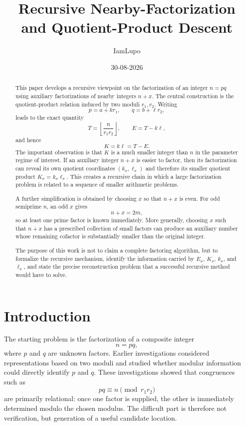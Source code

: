 \documentclass[11pt,a4paper]{article}
\title{\textbf{Recursive Nearby-Factorization and Quotient-Product Descent}}
\author{IamLupo}
\date{30-08-2026}
\begin{document}
\maketitle

\begin{abstract}
This paper develops a recursive viewpoint on the factorization of an integer
$n=pq$ using auxiliary factorizations of nearby integers $n+x$. The central
construction is the quotient-product relation induced by two moduli
$r_1,r_2$. Writing
\[
    p=a+k r_1,\qquad q=b+\ell r_2,
\]
leads to the exact quantity
\[
    T=\left\lfloor \frac{n}{r_1r_2}\right\rfloor,
    \qquad
    E=T-k\ell,
\]
and hence
\[
    K=k\ell=T-E.
\]
The important observation is that $K$ is a much smaller integer than
$n$ in the parameter regime of interest. If an auxiliary integer $n+x$
is easier to factor, then its factorization can reveal its own quotient
coordinates $(k_x,\ell_x)$ and therefore its smaller quotient product
$K_x=k_x\ell_x$. This creates a recursive chain in which a large
factorization problem is related to a sequence of smaller arithmetic
problems.

A further simplification is obtained by choosing $x$ so that $n+x$ is even.
For odd semiprime $n$, an odd $x$ gives
\[
    n+x=2m,
\]
so at least one prime factor is known immediately. More generally,
choosing $x$ such that $n+x$ has a prescribed collection of small factors
can produce an auxiliary number whose remaining cofactor is substantially
smaller than the original integer.

The purpose of this work is not to claim a complete factoring algorithm,
but to formalize the recursive mechanism, identify the information carried
by $E_x$, $K_x$, $k_x$, and $\ell_x$, and state the precise reconstruction
problem that a successful recursive method would have to solve.
\end{abstract}

\section{Introduction}

The starting problem is the factorization of a composite integer
\[
    n=pq,
\]
where $p$ and $q$ are unknown factors. Earlier investigations considered
representations based on two moduli and studied whether modular information
could directly identify $p$ and $q$. These investigations showed that
congruences such as
\[
    pq\equiv n\pmod{r_1r_2}
\]
are primarily relational: once one factor is supplied, the other is
immediately determined modulo the chosen modulus. The difficult part is
therefore not verification, but generation of a useful candidate location.
\end{document}
